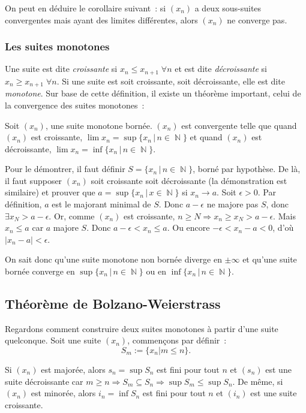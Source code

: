 \documentclass{article}
\DeclareMathOperator{\N}{\mathbb N}
\theoremstyle{definition}
\theoremstyle{remark}
\begin{document}
			On peut en déduire le corollaire suivant~: si $(x_n)$ a deux sous-suites convergentes mais ayant des limites différentes, alors $(x_n)$ ne converge pas.

		\subsubsection{Les suites monotones}
			Une suite est dite \textit{croissante} si $x_n \leq x_{n+1} \; \forall n$ et est dite \textit{décroissante} si $x_n \geq x_{n+1} \; \forall n$.
			Si une suite est soit croissante, soit décroissante, elle est dite \textit{monotone}. Sur base de cette définition, il existe un théorème important,
			celui de la convergence des suites monotones~:

			Soit $(x_n)$, une suite monotone bornée. $(x_n)$ est convergente telle que quand $(x_n)$ est croissante, $\lim x_n = \sup\{x_n \, | \, n \in \N\}$
			et quand $(x_n)$ est décroissante, $\lim x_n = \inf\{x_n \, | \, n \in \N\}$.

			Pour le démontrer, il faut définir $S = \{x_n \, | \, n \in \N\}$, borné par hypothèse. De là, il faut supposer $(x_n)$ soit croissante soit
			décroissante (la démonstration est similaire) et prouver que $a = \sup\{x_n \, | \, x \in \N\}$ si $x_n \to a$. Soit $\epsilon > 0$. Par définition,
			$a$ est le majorant minimal de $S$. Donc $a-\epsilon$ ne majore pas $S$, donc $\exists x_N > a-\epsilon$. Or, comme $(x_n)$ est croissante,
			$n \geq N \Rightarrow x_n \geq x_N > a-\epsilon$. Mais $x_n \leq a$ car $a$ majore $S$. Donc $a-\epsilon < x_n \leq a$. Ou encore $-\epsilon < x_n - a < 0$,
			d'où $|x_n - a| < \epsilon$.

			On sait donc qu'une suite monotone non bornée diverge en $\pm \infty$ et qu'une suite bornée converge en $\sup\{x_n \, | \, n \in \N\}$ ou en
			$\inf\{x_n \, | \, n \in \N\}$.

	\subsection{Théorème de Bolzano-Weierstrass}
		Regardons comment construire deux suites monotones à partir d'une suite quelconque. Soit une suite $(x_n)$, commençons par définir~:
		\[S_m := \{x_n | m \leq n\}.\]

		Si $(x_n)$ est majorée, alors $s_n = \sup S_n$ est fini pour tout $n$ et $(s_n)$ est une suite décroissante car $m \geq n \Rightarrow S_m \subseteq S_n \Rightarrow
		\sup S_m \leq \sup S_n$. De même, si $(x_n)$ est minorée, alors $i_n = \inf S_n$ est fini pour tout $n$ et $(i_n)$ est une suite croissante.
\end{document}
